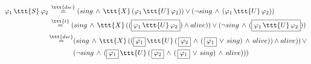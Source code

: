 \documentclass[11pt]{article}
\begin{document}
    $\begin{aligned}
         \varphi_1\,\ttt{S}\,\varphi_2 \,&\overset{\ttt{dsc}}{=} (sing\,\land\,\ttt{X}\,(\varphi_1\,\ttt{U}\,\varphi_2)) \lor (\neg sing\,\land\,(\varphi_1\,\ttt{U}\,\varphi_2))\\
         &\overset{\ttt{t}}{=} (sing\,\land\,\ttt{X}\,((\boxed{\varphi_1\,\ttt{U}\,\varphi_2}) \land alive)) \lor (\neg sing\,\land\,(\boxed{\varphi_1\,\ttt{U}\,\varphi_2}))\\
         &\begin{aligned}\overset{\ttt{dsc}}{=}&(sing\,\land\,\ttt{X}\,((\boxed{\varphi_1}\,\ttt{U}\,(\,\boxed{\varphi_2}\,\land\,(\,\boxed{\varphi_1}\,\lor\,sing)\,\land\,alive)) \land alive))\,\lor\, \\
         &(\neg sing\,\land\,(\boxed{\varphi_1}\,\ttt{U}\,(\,\boxed{\varphi_2}\,\land\,(\,\boxed{\varphi_1}\,\lor\,sing)\,\land\,alive)))\end{aligned}
    \end{aligned}$
\end{document}
